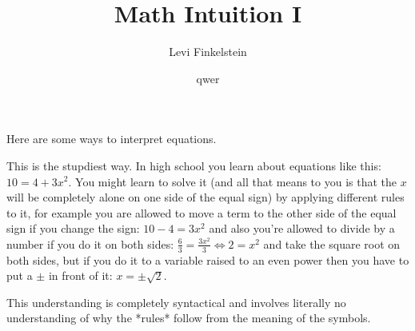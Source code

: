 \title{Math Intuition I}
\author{Levi Finkelstein}
\date{qwer}


\maketitle
Here are some ways to interpret equations.
\par
This is the stupdiest way.
In high school you learn about equations like this: $10 = 4 + 3x^2$.
You might learn to solve it (and all that means to you is that the $x$ will be completely alone on one side of the equal sign) by applying different rules to it, for example you are allowed to move a term to the other side of the equal sign if you change the sign: $10 - 4 = 3x^2$
and also you're allowed to divide by a number if you do it on both sides: $\frac{6}{3}=\frac{3x^2}{3}\iff 2=x^2$ and take the square root on both sides, but if you do it to a variable raised to an even power then you have to put a $\pm$ in front of it: $x = \pm\sqrt{2}$.

\par

This understanding is completely syntactical and involves literally no understanding of why the *rules* follow from the meaning of the symbols.

\par


